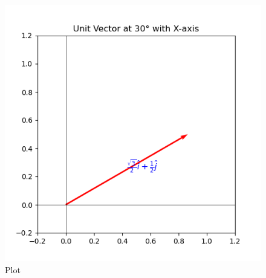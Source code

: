 \documentclass{beamer}
\begin{document}
 \begin{figure}
    \centering
    \includegraphics[width=0.8\columnwidth]{Figure _2.png}
    \caption{Plot}
    \label{fig:placeholder}
\end{figure}
\end{document}
